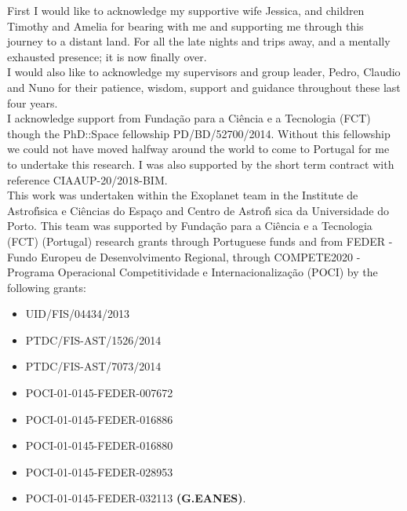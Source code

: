 \begin{acknowledgements}
First I would like to acknowledge my supportive wife Jessica, and children Timothy and Amelia for bearing with me and supporting me through this journey to a distant land.
For all the late nights and trips away, and a mentally exhausted presence; it is now finally over.\\

I would also like to acknowledge my supervisors and group leader, Pedro, Claudio and Nuno for their patience, wisdom, support and guidance throughout these last four years.\\

I acknowledge support from Funda\c{c}\~{a}o para a Ci\^encia e a Tecnologia (FCT) though the PhD::Space fellowship PD/BD/52700/2014.
Without this fellowship we could not have moved halfway around the world to come to Portugal for me to undertake this research.
I was also supported by the short term contract with reference CIAAUP-20/2018-BIM.\\

This work was undertaken within the Exoplanet team in the Institute de Astrof\'{\i}sica e Ci\^encias do Espa\c{c}o and Centro de Astrof\'{\i} sica da Universidade do Porto.
This team was supported by Funda\c{c}\~ao para a Ci\^{e}ncia e a Tecnologia (FCT) (Portugal) research grants through Portuguese funds and from FEDER - Fundo Europeu de Desenvolvimento Regional, through COMPETE2020 - Programa Operacional Competitividade e Internacionaliza\c{c}\~{a}o (POCI) by the following grants:
\begin{itemize}[noitemsep,nolistsep]
\item[] UID/FIS/04434/2013 
\item[] PTDC/FIS-AST/1526/2014
\item[] PTDC/FIS-AST/7073/2014
\item[] POCI-01-0145-FEDER-007672
\item[] POCI-01-0145-FEDER-016886
\item[] POCI-01-0145-FEDER-016880
\item[] POCI-01-0145-FEDER-028953
\item[] POCI-01-0145-FEDER-032113 \textbf{(G.EANES)}.
\end{itemize}

\end{acknowledgements}
